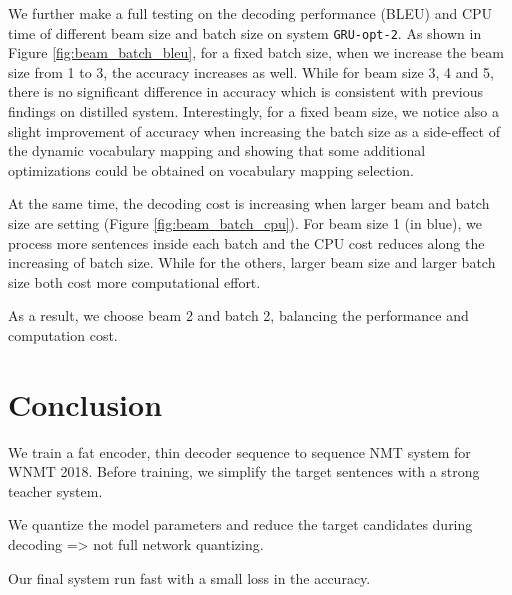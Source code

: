 \documentclass[11pt,a4paper]{article}
\begin{document}
We further make a full testing on the decoding performance (BLEU) and CPU time of different beam size and batch size on system {\tt GRU-opt-2}.
As shown in Figure \ref{fig:beam_batch_bleu}, for a fixed batch size, when we increase the beam size from 1 to 3, the accuracy increases as well.
While for beam size 3, 4 and 5, there is no significant difference in accuracy which is consistent with previous findings on distilled system.
Interestingly, for a fixed beam size, we notice also a slight improvement of accuracy when increasing the batch size as a side-effect of the dynamic vocabulary mapping and showing that some additional optimizations could be obtained on vocabulary mapping selection.



At the same time, the decoding cost is increasing when larger beam and batch size are setting (Figure \ref{fig:beam_batch_cpu}).
For beam size 1 (in blue), we process more sentences inside each batch and the CPU cost reduces along the increasing of batch size.
While for the others, larger beam size and larger batch size both cost more computational effort.

As a result, we choose beam 2 and batch 2, balancing the performance and computation cost.



\section{Conclusion}

We train a fat encoder, thin decoder sequence to sequence NMT system for WNMT 2018.
Before training, we simplify the target sentences with a strong teacher system.

We quantize the model parameters and reduce the target candidates during decoding => not full network quantizing.

Our final system run fast with a small loss in the accuracy.

%

%
%


\end{document}

